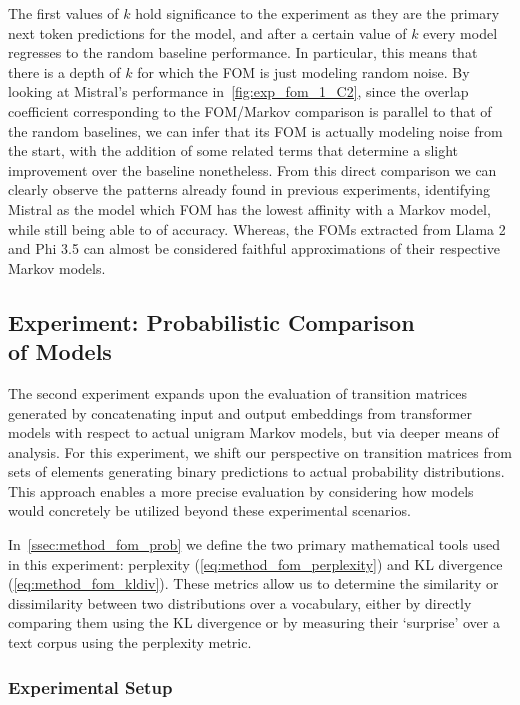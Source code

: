 The first values of $k$ hold  significance to the experiment as they are the primary next token predictions for the model, and after a certain value of $k$ every model regresses to the random baseline performance.
In particular, this means that there is a depth of $k$ for which the FOM is just modeling random noise.
By looking at Mistral's performance in~\cref{fig:exp_fom_1_C2}, since the overlap coefficient corresponding to the FOM/Markov comparison is parallel to that of the random baselines, we can infer that its FOM is actually modeling noise from the start, with the addition of some related terms that determine a slight improvement over the baseline nonetheless.
From this direct comparison we can clearly observe the patterns already found in previous experiments, identifying Mistral as the model which FOM has the lowest affinity with a Markov model, while still being able to  of accuracy.
Whereas, the FOMs extracted from Llama 2 and Phi 3.5 can almost be considered faithful approximations of their respective Markov models.

\subsection{Experiment: Probabilistic Comparison \texorpdfstring{ \\ }{}  of Models}\label{ssec:exp_fom_exp2}

The second experiment expands upon the evaluation of transition matrices generated by concatenating input and output embeddings from transformer models with respect to actual unigram Markov models, but via deeper means of analysis.
For this experiment, we shift our perspective on transition matrices from sets of elements generating binary predictions to actual probability distributions.
This approach enables a more precise evaluation by considering how models would concretely be utilized beyond these experimental scenarios.

In~\cref{ssec:method_fom_prob} we define the two primary mathematical tools used in this experiment: perplexity (\cref{eq:method_fom_perplexity}) and KL divergence (\cref{eq:method_fom_kldiv}).
These metrics allow us to determine the similarity or dissimilarity between two distributions over a vocabulary, either by directly comparing them using the KL divergence or by measuring their `surprise' over a text corpus using the perplexity metric.

\subsubsection{Experimental Setup}

